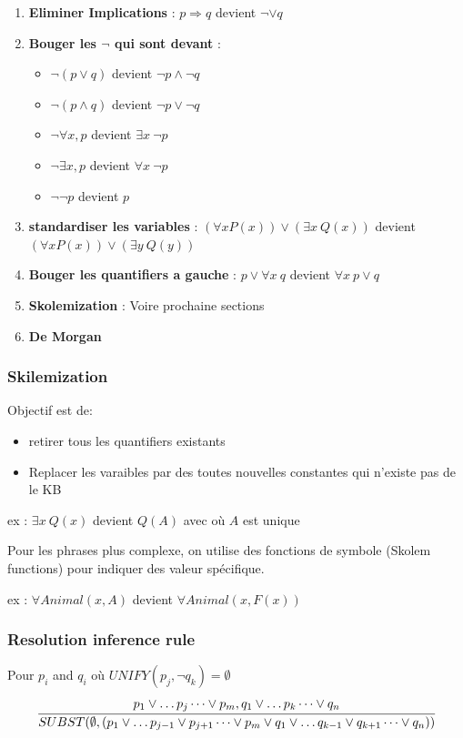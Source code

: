 		\begin{enumerate}
			\item \textbf{Eliminer Implications} : $p \Rightarrow q$ devient $\neg  \lor q$ 
			\item \textbf{Bouger  les $\neg$ qui sont devant}  :
			\begin{itemize}
				\item $\neg(p\lor q)$ devient $\neg p \land \neg q$
				\item $\neg(p\land q)$ devient $\neg p \lor \neg q$
				\item $\neg \forall x, p$ devient $ \exists x \ \neg p$
				\item $\neg \exists x, p$ devient $\forall x\  \neg p$
				\item $\neg \neg p$ devient $p$
			\end{itemize}
			\item \textbf{standardiser les variables} : $(\forall x P(x)) \lor (\exists x \ Q(x))$ devient $(\forall x P(x)) \lor (\exists y \ Q(y))$
			\item \textbf{Bouger les quantifiers a gauche} : $p \lor \forall x \ q$ devient $\forall x \ p \lor q$
			\item \textbf{Skolemization} : Voire prochaine sections
			\item \textbf{De Morgan}
		\end{enumerate}
		
		\subsubsection{Skilemization}
			Objectif est de:
			\begin{itemize}
				\item retirer tous les quantifiers existants
				\item Replacer les varaibles par des toutes nouvelles constantes qui n'existe pas de le KB
			\end{itemize}			 
			
			ex : $\exists x \ Q(x)$ devient $Q(A)$ avec où $A$ est unique
			
			Pour les phrases plus complexe, on utilise des fonctions de symbole (Skolem functions) pour indiquer des valeur  spécifique.
			
			ex : $\forall Animal(x,A)$ devient $\forall Animal(x,F(x))$
			
		\subsubsection{Resolution inference rule}
			Pour $p_i$ and $q_i$ où $UNIFY(p_j, \neg q_k) = \emptyset$
			\begin{equation}
				\cfrac{p_1 \lor \dots p_j \dots \lor p_m, q_1 \lor \dots p_k \dots \lor q_n}{SUBST(\emptyset,(p_1 \lor \dots p_{j-1} \lor p_{j+1} \dots \lor p_m \lor q_1 \lor \dots q_{k-1} \lor q_{k+1} \dots \lor q_n))}
			\end{equation}
			
